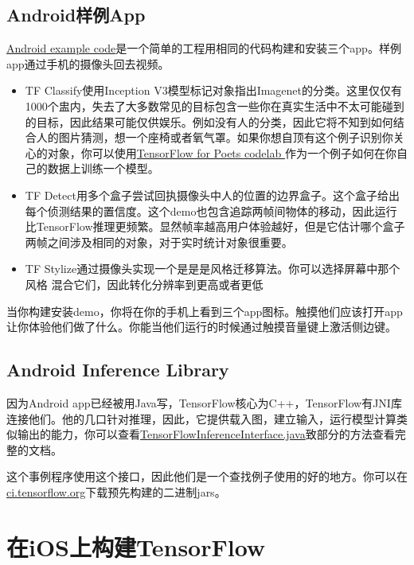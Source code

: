 \subsection{Android样例App}
\href{https://www.github.com/tensorflow/tensorflow/blob/r1.4/tensorflow/examples/android/}{Android example code}是一个简单的工程用相同的代码构建和安装三个app。样例app通过手机的摄像头回去视频。
\begin{itemize}
\item TF Classify使用Inception V3模型标记对象指出Imagenet的分类。这里仅仅有1000个盅内，失去了大多数常见的目标包含一些你在真实生活中不太可能碰到的目标，因此结果可能仅供娱乐。例如没有人的分类，因此它将不知到如何结合人的图片猜测，想一个座椅或者氧气罩。如果你想自顶有这个例子识别你关心的对象，你可以使用\href{https://codelabs.developers.google.com/codelabs/tensorflow-for-poets/index.html?hl=zh-cn#0}{TensorFlow for Poets codelab }作为一个例子如何在你自己的数据上训练一个模型。
\item TF Detect用多个盒子尝试回执摄像头中人的位置的边界盒子。这个盒子给出每个侦测结果的置信度。这个demo也包含追踪两帧间物体的移动，因此运行比TensorFlow推理更频繁。显然帧率越高用户体验越好，但是它估计哪个盒子两帧之间涉及相同的对象，对于实时统计对象很重要。
\item TF Stylize通过摄像头实现一个是是是风格迁移算法。你可以选择屏幕中那个风格
混合它们，因此转化分辨率到更高或者更低
\end{itemize}
当你构建安装demo，你将在你的手机上看到三个app图标。触摸他们应该打开app让你体验他们做了什么。你能当他们运行的时候通过触摸音量键上激活侧边键。
\subsection{Android Inference Library}
因为Android app已经被用Java写，TensorFlow核心为C++，TensorFlow有JNI库连接他们。他的几口针对推理，因此，它提供载入图，建立输入，运行模型计算类似输出的能力，你可以查看\href{https://www.github.com/tensorflow/tensorflow/blob/r1.4/tensorflow/contrib/android/java/org/tensorflow/contrib/android/TensorFlowInferenceInterface.java}{TensorFlowInferenceInterface.java}致部分的方法查看完整的文档。

这个事例程序使用这个接口，因此他们是一个查找例子使用的好的地方。你可以在\href{https://ci.tensorflow.org/view/Nightly/job/nightly-android/?hl=zh-cn}{ci.tensorflow.org}下载预先构建的二进制jars。
\section{在iOS上构建TensorFlow}
